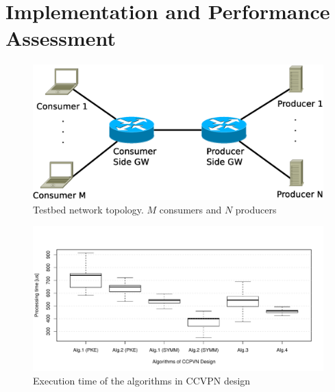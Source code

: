 \section{Implementation and Performance Assessment}\label{sec:exp}

\begin{figure}
\centering
\includegraphics[width=\columnwidth]{images/testnet.eps}
\caption{Testbed network topology. $M$ consumers and $N$ producers}\label{testnet}
\end{figure}

\begin{figure}
\centering
\includegraphics[width=\columnwidth]{images/times.pdf}
\caption{Execution time of the algorithms in CCVPN design}\label{times}
\end{figure}

